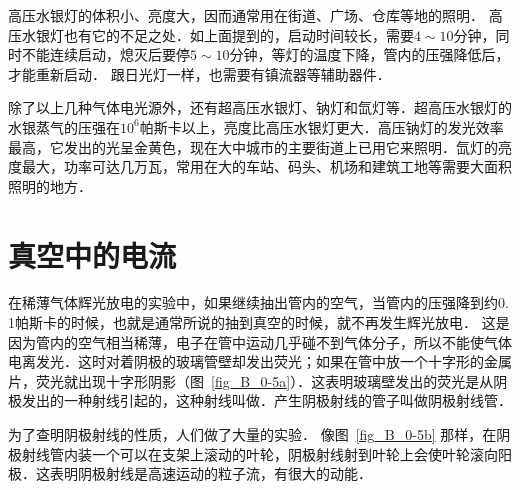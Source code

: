 高压水银灯的体积小、亮度大，因而通常用在街道、广场、仓库等地的照明．
高压水银灯也有它的不足之处．如上面提到的，启动时间较长，需要$4 \sim 10$分钟，同时不能连续启动，熄灭后要停$5 \sim 10$分钟，等灯的温度下降，管内的压强降低后，才能重新启动．
跟日光灯一样，也需要有镇流器等辅助器件．

除了以上几种气体电光源外，还有超高压水银灯、钠灯和氙灯等．超高压水银灯的水银蒸气的压强在$10^6$帕斯卡以上，亮度比高压水银灯更大．高压钠灯的发光效率最高，它发出的光呈金黄色，现在大中城市的主要街道上已用它来照明．氙灯的亮度最大，功率可达几万瓦，常用在大的车站、码头、机场和建筑工地等需要大面积照明的地方．

\section{真空中的电流}

在稀薄气体辉光放电的实验中，如果继续抽出管内的空气，当管内的压强降到约0. 1帕斯卡的时候，也就是通常所说的抽到真空的时候，就不再发生辉光放电．
这是因为管内的空气相当稀薄，电子在管中运动几乎碰不到气体分子，所以不能使气体电离发光．这时对着阴极的玻璃管壁却发出荧光；如果在管中放一个十字形的金属片，荧光就出现十字形阴影（图~\ref{fig_B_0-5a}）．这表明玻璃壁发出的荧光是从阴极发出的一种射线引起的，这种射线叫做．产生阴极射线的管子叫做阴极射线管．

为了查明阴极射线的性质，人们做了大量的实验．
像图~\ref{fig_B_0-5b}  那样，在阴极射线管内装一个可以在支架上滚动的叶轮，阴极射线射到叶轮上会使叶轮滚向阳极．这表明阴极射线是高速运动的粒子流，有很大的动能．

